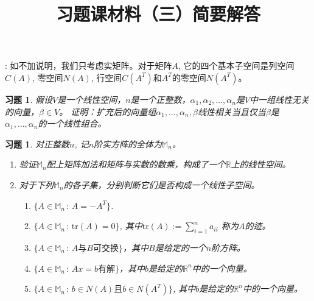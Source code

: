 \documentclass[UTF8]{ctexart}
\newtheorem{ex}[thm]{习题}
\begin{document}
\title{习题课材料（三）简要解答}

\date{}

\maketitle

\vspace{-1cm}






\medskip

: 如不加说明，我们只考虑实矩阵。对于矩阵$A$, 它的四个基本子空间是列空间$C(A)$, 零空间$N(A)$, 行空间$C(A^T)$和$A^T$的零空间$N(A^T)$。
\medskip

\begin{ex} 假设$V$是一个线性空间，$n$是一个正整数，$\alpha_1,\alpha_2,\dots,\alpha_n$是$V$中一组线性无关的向量，$\beta \in V$。 证明：扩充后的向量组$\alpha_1,\dots,\alpha_n,\beta$线性相关当且仅当$\beta$是$\alpha_1,\dots,\alpha_n$的一个线性组合。
\end{ex}



\begin{ex} 对正整数$n$, 记$n$阶实方阵的全体为$\mathbb{M}_n$。
\begin{enumerate}
\item 验证$\mathbb{M}_n$配上矩阵加法和矩阵与实数的数乘，构成了一个$\mathbb{R}$上的线性空间。
\item 对于下列$\mathbb{M}_n$的各子集，分别判断它们是否构成一个线性子空间。
\begin{enumerate}
\item $\{A \in \mathbb{M}_n \,:\, A = -A^T\}$.
\item $\{A \in \mathbb{M}_n \,:\, \mathrm{tr} (A) = 0\}$, 其中$\mathrm{tr}(A) := \sum_{i=1}^n a_{ii}$ 称为$A$的迹。
\item $\{A \in \mathbb{M}_n \,:\, \text{$A$与$B$可交换}\}$，其中$B$是给定的一个$n$阶方阵。
\item $\{A \in \mathbb{M}_n \,:\, \text{$Ax = b$有解}\}$，其中$b$是给定的$\mathbb{R}^n$中的一个向量。
\item $\{A \in \mathbb{M}_n \,:\, \text{$b\in N(A)$且$b\in N(A^T)$}\}$, 其中$b$是给定的$\mathbb{R}^n$中的一个向量。
\end{enumerate}
\end{enumerate}
\end{ex}
\end{document}
